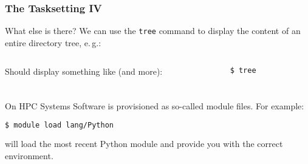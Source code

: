 \begin{frame}[fragile]
  \frametitle{The Tasksetting IV}
  What else is there?\newline
  We can use the \texttt{tree} command to display the content of an entire directory tree, e.\,g.:
  \begin{columns}
    \begin{column}{0.2\textwidth}
    \footnotesize
     Should display something like (and more):
    \end{column}
    \begin{column}{0.8\textwidth}
    \begin{minipage}[t]{0.5\textwidth}
            {\tiny \DTsetlength{0.2em}{1em}{0.2em}{0.4pt}{.6pt}
\texttt{\$ tree}
}
    \end{minipage}


    \end{column}
  \end{columns}
\end{frame}

\begin{frame}[fragile]
  \frametitle{}
  On HPC Systems Software is provisioned as so-called module files. For example:
  \begin{lstlisting}[language=Bash, style=Shell]
$ module load lang/Python
  \end{lstlisting}
  will load the most recent Python module and provide you with the correct environment.
\end{frame}

